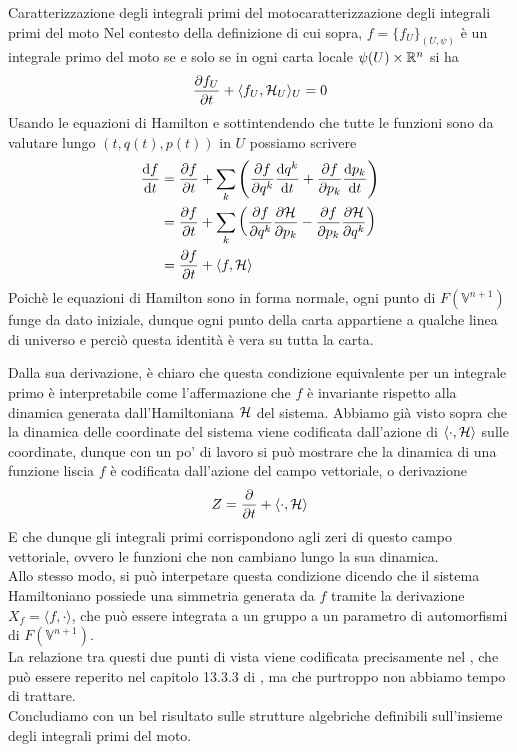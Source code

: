 \documentclass[openany]{book}
\renewcommand\V{\mathbb{V}}
\begin{document}
\begin{proposition}{Caratterizzazione degli integrali primi del moto}{caratterizzazione degli integrali primi del moto}
    Nel contesto della definizione di cui sopra, $f = \{ f_U\}_{(U,\psi)}$ è un integrale primo del moto se e solo se in ogni carta locale $\psi(U)\times\mathbb{R}^n$ si ha 
    \[ \frac{\partial f_U}{\partial t} + \langle f_U,\mathcal{H}_U\rangle_U = 0 \]
    \proof 
    Usando le equazioni di Hamilton e sottintendendo che tutte le funzioni sono da valutare lungo $(t,q(t),p(t))$ in $U$ possiamo scrivere 
    \begin{align*}
        \frac{\text{d} f}{\text{d} t} & = \frac{\partial f}{\partial t} + \sum_k\left( \frac{\partial f}{\partial q^k} \frac{\text{d} q^k}{\text{d} t} + \frac{\partial f}{\partial p_k}\frac{\text{d} p_k}{\text{d} t} \right) \\
        & = \frac{\partial f}{\partial t} + \sum_k\left( \frac{\partial f}{\partial q^k} \frac{\partial \mathcal{H}}{\partial p_k} - \frac{\partial f}{\partial p_k}\frac{\partial \mathcal{H}}{\partial q^k} \right) \\
        & = \frac{\partial f}{\partial t} + \langle f, \mathcal{H}\rangle
    \end{align*}
    Poichè le equazioni di Hamilton sono in forma normale, ogni punto di $F(\V^{n+1})$ funge da dato iniziale, dunque ogni punto della carta appartiene a qualche linea di universo e perciò questa identità è vera su tutta la carta.
\end{proposition}

Dalla sua derivazione, è chiaro che questa condizione equivalente per un integrale primo è interpretabile come l'affermazione che $f$ è invariante rispetto alla dinamica generata dall'Hamiltoniana $\mathcal{H}$ del sistema. Abbiamo già visto sopra che la dinamica delle coordinate del sistema viene codificata dall'azione di $\langle \cdot, \mathcal{H}\rangle$ sulle coordinate, dunque con un po' di lavoro si può mostrare che la dinamica di una funzione liscia $f$ è codificata dall'azione del campo vettoriale, o derivazione 
\[ Z = \frac{\partial}{\partial t} + \langle\cdot, \mathcal{H}\rangle \]
E che dunque gli integrali primi corrispondono agli zeri di questo campo vettoriale, ovvero le funzioni che non cambiano lungo la sua dinamica.\\
Allo stesso modo, si può interpetare questa condizione dicendo che il sistema Hamiltoniano possiede una simmetria generata da $f$ tramite la derivazione $X_f = \langle f,\cdot\rangle$, che può essere integrata a un gruppo a un parametro di automorfismi di $F(\V^{n+1})$.\\
La relazione tra questi due punti di vista viene codificata precisamente nel , che può essere reperito nel capitolo 13.3.3 di \cite{Moretti2024}, ma che purtroppo non abbiamo tempo di trattare.\\
Concludiamo con un bel risultato sulle strutture algebriche definibili sull'insieme degli integrali primi del moto.
\end{document}
